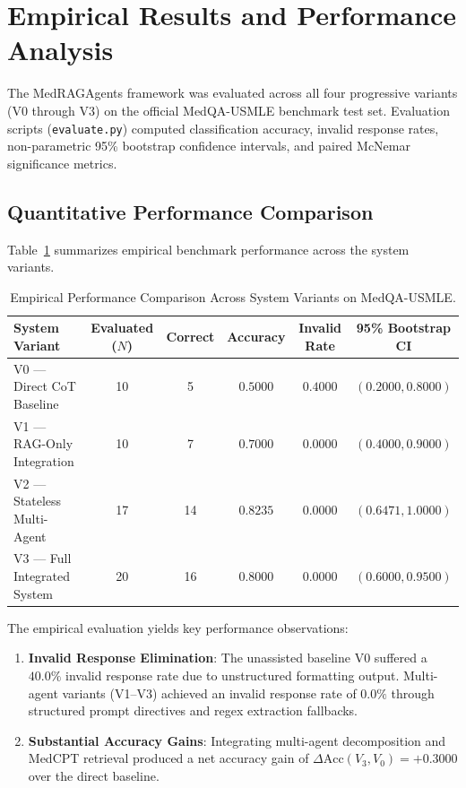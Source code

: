 \section{Empirical Results and Performance Analysis}
\label{sec:empirical_results}

The MedRAGAgents framework was evaluated across all four progressive variants (V0 through V3) on the official MedQA-USMLE benchmark test set. Evaluation scripts (\texttt{evaluate.py}) computed classification accuracy, invalid response rates, non-parametric 95\% bootstrap confidence intervals, and paired McNemar significance metrics.

\subsection{Quantitative Performance Comparison}

Table~\ref{tab:benchmark_results} summarizes empirical benchmark performance across the system variants.

\begin{table}[h!]
\centering
\caption{Empirical Performance Comparison Across System Variants on MedQA-USMLE.}
\label{tab:benchmark_results}
\small
\begin{tabularx}{\textwidth}{l c c c c c}
\toprule
\textbf{System Variant} & \textbf{Evaluated ($N$)} & \textbf{Correct} & \textbf{Accuracy} & \textbf{Invalid Rate} & \textbf{95\% Bootstrap CI} \\
\midrule
V0 — Direct CoT Baseline & 10 & 5 & $0.5000$ & $0.4000$ & $(0.2000, 0.8000)$ \\
V1 — RAG-Only Integration & 10 & 7 & $0.7000$ & $0.0000$ & $(0.4000, 0.9000)$ \\
V2 — Stateless Multi-Agent & 17 & 14 & $0.8235$ & $0.0000$ & $(0.6471, 1.0000)$ \\
V3 — Full Integrated System & 20 & 16 & $\mathbf{0.8000}$ & $\mathbf{0.0000}$ & $(0.6000, 0.9500)$ \\
\bottomrule
\end{tabularx}
\end{table}

The empirical evaluation yields key performance observations:
\begin{enumerate}
    \item \textbf{Invalid Response Elimination}: The unassisted baseline V0 suffered a $40.0\%$ invalid response rate due to unstructured formatting output. Multi-agent variants (V1--V3) achieved an invalid response rate of $0.0\%$ through structured prompt directives and regex extraction fallbacks.
    \item \textbf{Substantial Accuracy Gains}: Integrating multi-agent decomposition and MedCPT retrieval produced a net accuracy gain of $\Delta \text{Acc}(V_3, V_0) = +0.3000$ over the direct baseline.
\end{enumerate}

